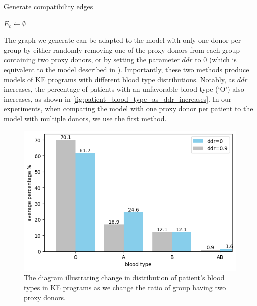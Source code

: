 \begin{algorithm}
    \caption{Generate compatibility edges}
    \label{alg:generate_compatibility_edges}


    $E_c \gets \emptyset$\;

\end{algorithm}

The graph we generate can be adapted to the model with only one donor per group by either randomly removing one of the proxy donors from each group containing two proxy donors, or by setting the parameter $ddr$ to $0$ (which is equivalent to the model described in \cite{toulis2011random}). Importantly, these two methods produce models of KE programs with different blood type distributions. Notably, as $ddr$ increases, the percentage of patients with an unfavorable blood type (‘O’) also increases, as shown in \autoref{fig:patient_blood_type_as_ddr_increases}. In our experiments, when comparing the model with one proxy donor per patient to the model with multiple donors, we use the first method.

\begin{figure}[H]
    \centering
    \includegraphics[width=1.\linewidth]{data/patient_blood_type_as_ddr_increases.png}
    \caption[Distribution of patient's blood types as double donor ratio changes]{The diagram illustrating change in distribution of patient's blood types in KE programs as we change the ratio of group having two proxy donors.}
    \label{fig:patient_blood_type_as_ddr_increases}
\end{figure}


